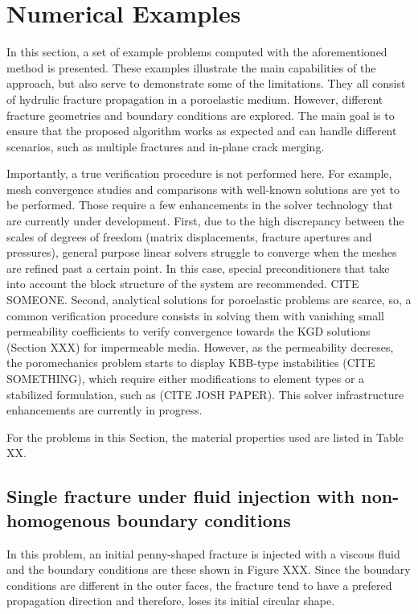 \section{Numerical Examples}
\label{section: Chapter4/examples}

In this section, a set of example problems computed with the aforementioned method is presented. These examples illustrate the main capabilities of the approach, but also serve to demonstrate some of the limitations. They all consist of hydrulic fracture propagation in a poroelastic medium. However, different fracture geometries and boundary conditions are explored. The main goal is to ensure that the proposed algorithm works as expected and can handle different scenarios, such as multiple fractures and in-plane crack merging.

Importantly, a true verification procedure is not performed here. For example, mesh convergence studies and comparisons with well-known solutions are yet to be performed. Those require a few enhancements in the solver technology that are currently under development. First, due to the high discrepancy between the scales of degrees of freedom (matrix displacements, fracture apertures and pressures), general purpose linear solvers struggle to converge when the meshes are refined past a certain point. In this case, special preconditioners that take into account the block structure of the system are recommended. CITE SOMEONE. Second, analytical solutions for poroelastic problems are scarce, so, a common verification procedure consists in solving them with vanishing small permeability coefficients to verify convergence towards the KGD solutions (Section XXX) for impermeable media. However, as the permeability decreses, the poromechanics problem starts to display KBB-type instabilities (CITE SOMETHING), which require either modifications to element types or a stabilized formulation, such as (CITE JOSH PAPER). This solver infrastructure enhancements are currently in progress.

For the problems in this Section, the material properties used are listed in Table XX. 


\subsection{Single fracture under fluid injection with non-homogenous boundary conditions}

In this problem, an initial penny-shaped fracture is injected with a viscous fluid and the boundary conditions are these shown in Figure XXX. Since the boundary conditions are different in the outer faces, the fracture tend to have a prefered propagation direction and therefore, loses its initial circular shape. 

